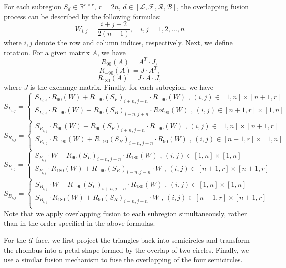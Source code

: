 For each subregion $S_d\in \mathbb{R}^{r\times r}$, $r=2n$, $d \in [\mathcal{L,F,R,B}]$, the overlapping fusion process can be described by the following formulas:
\begin{equation}  
W_{i,j} = \frac{i+j-2}{2(n-1)}, \quad i, j = 1, 2, \dots, n
\end{equation}
where $i, j$ denote the row and column indices, respectively. Next, we define rotation. For a given matrix $A$, we have
\begin{equation}  
R_{90}(A)= A^T \cdot J, %
\end{equation}
\begin{equation}  
R_{-90}(A)=  J \cdot A^T ,  %
\end{equation}
\begin{equation}  
R_{180}(A)=  J \cdot A \cdot J ,  %
\end{equation}
where $J$ is the exchange matrix. Finally, for each subregion, we have
\begin{equation}  
S_{L_{i,j}}=\begin{cases}
S_{L_{i,j}} \cdot R_{90}(W) + R_{-90}(S_F)_{i+n,j-n} \cdot R_{-90}(W) \text{ , } (i,j)\in [1,n]\times [n+1,r] \\
S_{L_{i,j}} \cdot R_{-90}(W) + R_{90}(S_B)_{i-n,j+n} \cdot Rot_{90}(W) \text{ , } (i,j)\in [n+1,r]\times [1,n]\\
\end{cases}
\end{equation}
\begin{equation}  
S_{R_{i,j}}=\begin{cases}
S_{R_{i,j}} \cdot R_{90}(W) + R_{90}(S_F)_{i+n,j-n} \cdot R_{-90}(W) \text{ , } (i,j)\in [1,n]\times [n+1,r] \\
S_{R_{i,j}} \cdot R_{-90}(W) + R_{-90}(S_B)_{i-n,j+n} \cdot R_{90}(W) \text{ , } (i,j)\in [n+1,r]\times [1,n]\\
\end{cases}
\end{equation}
\begin{equation}  
S_{F_{i,j}}=\begin{cases}
S_{F_{i,j}} \cdot W + R_{90}(S_L)_{i+n,j+n} \cdot R_{180}(W) \text{ , } (i,j)\in [1,n]\times [1,n] \\
S_{F_{i,j}} \cdot R_{180}(W) + R_{-90}(S_R)_{i-n,j-n} \cdot W \text{ , } (i,j)\in [n+1,r]\times [n+1,r]\\
\end{cases}
\end{equation}
\begin{equation}  
S_{B_{i,j}}=\begin{cases}
S_{B_{i,j}} \cdot W + R_{-90}(S_L)_{i+n,j+n} \cdot R_{180}(W) \text{ , } (i,j)\in [1,n]\times [1,n] \\
S_{B_{i,j}} \cdot R_{180}(W) + R_{90}(S_R)_{i-n,j-n} \cdot W \text{ , } (i,j)\in [n+1,r]\times [n+1,r]\\
\end{cases}
\end{equation}
%
Note that we apply overlapping fusion to each subregion simultaneously, rather than in the order specified in the above formulas.

For the $\mathcal{U}$ face, we first project the triangles back into semicircles and transform the rhombus into a petal shape formed by the overlap of two circles. 
%
Finally, we use a similar fusion mechanism to fuse the overlapping of the four semicircles.
